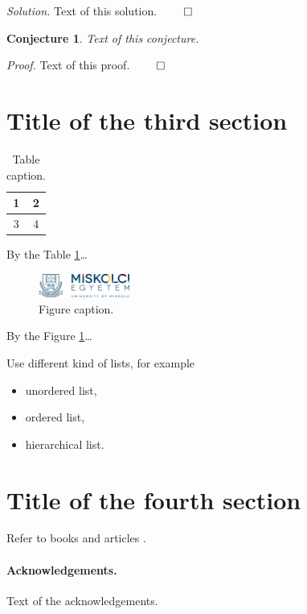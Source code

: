 \documentclass[a4paper,12pt]{article}
\newtheorem{conjecture}[theorem]{Conjecture}%
\renewenvironment{proof}[1][]{\noindent\textit{Proof.} }{$\qed$}
\newenvironment{solution}[1][]{\noindent\textit{Solution.} }{$\qed$}
\begin{document}
\begin{solution}
Text of this solution.
\end{solution}

\begin{conjecture}
Text of this conjecture.
\end{conjecture}

\begin{proof}
Text of this proof.
\end{proof}

\section{Title of the third section}

\begin{table}[!ht] %
  \centering
  \caption{Table caption.}\label{table:Key3}
  \medskip
  \begin{tabular}{|c|c|}
    \hline
    1 & 2 \\
    \hline
    3 & 4 \\
    \hline
  \end{tabular}
\end{table}

By the Table \ref{table:Key3}\dots

\begin{figure}[!ht] %
  \centering
  \includegraphics[width=3cm]{ME_Logo.png}
  \caption{Figure caption.}\label{figure:Key4}
\end{figure}

By the Figure \ref{figure:Key4}\dots

Use different kind of lists, for example
\begin{itemize}
\item unordered list,
\item ordered list,
\item hierarchical list.
\end{itemize}

\section{Title of the fourth section}%

Refer to books \cite{erdos2013} and articles \cite{aczel1983}.

\paragraph{Acknowledgements.} Text of the acknowledgements.



\end{document}
